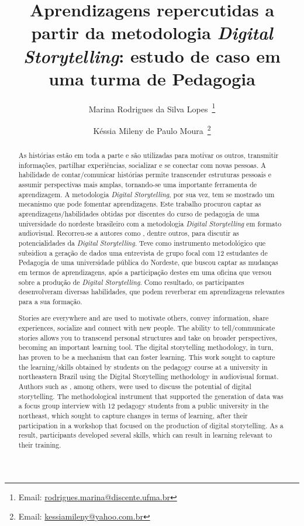 \documentclass[portuguese]{textolivre}
\title{Aprendizagens repercutidas a partir da metodologia \textit{Digital Storytelling}: estudo de caso em uma turma de Pedagogia}
\author[1]{Marina Rodrigues da Silva Lopes~\orcid{0000-0003-4128-4583}\thanks{Email: \href{mailto:rodrigues.marina@discente.ufma.br}{rodrigues.marina@discente.ufma.br}}}
\author[1]{Késsia Mileny de Paulo Moura~\orcid{0000-0002-5124-1432}\thanks{Email: \href{mailto:kessiamileny@yahoo.com.br}{kessiamileny@yahoo.com.br}}}
\affil[1]{Universidade Federal do Maranhão, CCIM, Imperatriz, MA, Brasil.}
\begin{document}
\maketitle
\begin{polyabstract}
\begin{abstract}
As histórias estão em toda a parte e são utilizadas para motivar os outros, transmitir informações, partilhar experiências, socializar e se conectar com novas pessoas. A habilidade de contar/comunicar histórias permite transcender estruturas pessoais e assumir perspectivas mais amplas, tornando-se uma importante ferramenta de aprendizagem. A metodologia \textit{Digital Storytelling}, por sua vez, tem se mostrado um mecanismo que pode fomentar aprendizagens. Este trabalho procurou captar as aprendizagens/habilidades obtidas por discentes do curso de pedagogia de uma universidade do nordeste brasileiro com a metodologia \textit{Digital Storytelling} em formato audiovisual. Recorreu-se a autores como \textcite{rodrigues2020narrativas,rodrigues2023para,pasinato2023educacao,moura2023narrativa,prado2017narrativas,cruz2016letramentos,robin2006usos}, dentre outros, para discutir as potencialidades da \textit{Digital Storytelling}. Teve como instrumento metodológico que subsidiou a geração de dados uma entrevista de grupo focal com 12 estudantes de Pedagogia de uma universidade pública do Nordeste, que buscou captar as mudanças em termos de aprendizagens, após a participação destes em uma oficina que versou sobre a produção de \textit{Digital Storytelling}. Como resultado, os participantes desenvolveram diversas habilidades, que podem reverberar em aprendizagens relevantes para a sua formação.

\end{abstract}

\begin{english}
\begin{abstract}
Stories are everywhere and are used to motivate others, convey information, share experiences, socialize and connect with new people. The ability to tell/communicate stories allows you to transcend personal structures and take on broader perspectives, becoming an important learning tool. The digital storytelling methodology, in turn, has proven to be a mechanism that can foster learning. This work sought to capture the learning/skills obtained by students on the pedagogy course at a university in northeastern Brazil using the Digital Storytelling methodology in audiovisual format. Authors such as \textcite{rodrigues2020narrativas,rodrigues2023para,pasinato2023educacao,moura2023narrativa,prado2017narrativas,cruz2016letramentos,robin2006usos}, among others, were used to discuss the potential of digital storytelling. The methodological instrument that supported the generation of data was a focus group interview with 12 pedagogy students from a public university in the northeast, which sought to capture changes in terms of learning, after their participation in a workshop that focused on the production of digital storytelling. As a result, participants developed several skills, which can result in learning relevant to their training.


\end{abstract}
\end{english}
\end{polyabstract}
\end{document}
